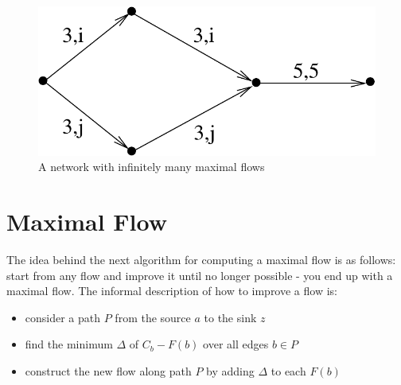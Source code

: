 \begin{figure}[ht]
\begin{center}
\includegraphics[width=0.3\linewidth,keepaspectratio]{stroom3} %
\end{center}
\caption{A network with infinitely many maximal flows\label{stroom3}}
\end{figure}


\section{Maximal Flow}

The idea behind the next algorithm for computing a maximal flow is as
follows: start from any flow and improve it until no longer possible -
you end up with a maximal flow. The informal description of how to
improve a flow is:
\begin{itemize}
\item
consider a path $P$ from the source $a$ to the sink $z$
\item
find the minimum $\Delta$ of $C_{b} - F(b)$ over all edges $b \in P$
\item
construct the new flow along path $P$ by adding $\Delta$ to each $F(b)$
\end{itemize}

